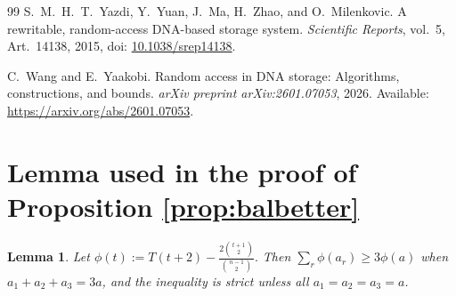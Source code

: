 \documentclass{article}
\newtheorem{lemma}{Lemma}
\begin{document}
\begin{thebibliography}{99}
S.~M.~H.~T.~Yazdi, Y.~Yuan, J.~Ma, H.~Zhao, and O.~Milenkovic.
A rewritable, random-access DNA-based storage system.
\emph{Scientific Reports}, vol.~5, Art.~14138, 2015,
doi: \href{https://doi.org/10.1038/srep14138}{10.1038/srep14138}.

C.~Wang and E.~Yaakobi. Random access in DNA storage: Algorithms, constructions, and bounds.
\emph{arXiv preprint arXiv:2601.07053}, 2026.
Available: \url{https://arxiv.org/abs/2601.07053}.

\end{thebibliography}
\newpage
\appendix
\section{Lemma used in the proof of Proposition \ref{prop:balbetter}}
\begin{lemma} \label{lem:phi}Let $\phi(t):=T(t+2)-\frac{2\binom{t+1}{2}}{\binom{n-1}{2}}.$
Then $\sum_{r}\phi(a_r)\ge3\phi(a)$ when $a_1+a_2+a_3=3a$, and the inequality is strict unless all $a_1=a_2=a_3=a$.
\end{lemma}
\end{document}
